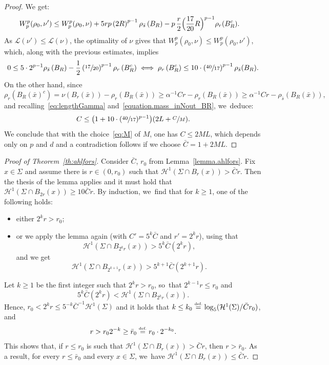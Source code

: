\documentclass[JEP,XML,SOM,Unicode,NoFloatCountersInSection,published]{cedram}
\theoremstyle{definition}
\newcommand{\eqdef}{\ensuremath{\stackrel{\mbox{\upshape\tiny def.}}{=}}}
\newcommand\cH{\mathcal{H}}
\begin{document}
\begin{proof}
We get:
\begin{align*}
W_p^p(\rho_0, \nu')
&\le
W_p^p(\rho_0, \nu)
+
5rp
\left(2R\right)^{p-1}\rho_{\bar s}\left(B_R\right)
-
p\,\frac{r}{2}
\Bigl(\frac{17}{20}R\Bigr)^{p-1}\rho_r(B_R^c).
\end{align*}
As $\mathcal{L}(\nu') \le \mathcal{L}(\nu)$, the optimality of $\nu$ gives that $W_p^p(\rho_0, \nu) \le W_p^p(\rho_0, \nu')$, which, along with the previous estimates, implies
\[
0 \le
5\cdot
2^{p-1}\rho_{\bar s}\left(B_R\right)
-
\frac{1}{2}
\left(\sfrac{17}{20}\right)^{p-1}\rho_r\left(B_R^c\right)
\iff
\rho_r\left(B_R^c\right)\le 10\cdot \left(\sfrac{40}{17}\right)^{p-1}
\rho_{\bar s}(B_R).
\]
On the other hand, since
\begin{equation*}
\rho_{r}\left(B_R(\bar x)^c\right) = \nu(B_r(\bar x))- \rho_r(B_R(\bar x)) \ge \alpha^{-1}Cr - \rho_r(B_R(\bar x))
\ge \alpha^{-1}Cr - \rho_{\bar s}(B_R(\bar x)),
\end{equation*}
and recalling~\eqref{eq:lengthGamma} and~\eqref{equation.mass_inNout_BR}, we~deduce:
\[
C
\le \bigl( 1+10\cdot(\sfrac{40}{17})^{p-1} \bigr)(2L+\sfrac{C}{M}).
\]
We conclude that with the choice~\eqref{eq:M} of $M$,
one has $C\le 2M L$, which depends only on $p$ and $d$ and a contradiction follows
if we choose $\bar C=1+2M L$.
\end{proof}

\begin{proof}[Proof of Theorem~\ref{th:ahlfors}]
Consider $\bar C$, $r_0$ from Lemma~\ref{lemma.ahlfors}. Fix $x\in \Sigma$ and assume
there is $r\in (0,r_0)$ such that $\cH^1(\Sigma\cap B_r(x)) > \bar Cr$. Then the thesis of the lemma applies and it must hold that $\cH^1(\Sigma\cap B_{2r}(x)) \ge 10\bar Cr$. By induction, we~find that for $k\ge 1$, one of the following holds:
\begin{itemize}
\item either $2^k r > r_0$;
\item or we apply the lemma again (with $C'=5^k\bar C$ and $r'=2^kr$), using that
\[
\cH^1(\Sigma\cap B_{2^{k}r}(x)) > 5^{k}\bar C(2^k r),
\]
and we get
\[
\cH^1(\Sigma\cap B_{2^{k+1}r}(x)) > 5^{k+1}\bar C(2^{k+1}r).
\]
\end{itemize}

Let $k\ge 1$ be the first integer such that $2^k r> r_0$, so~that $2^{k-1}r\le r_0$
and
\[
5^{k}\bar C(2^{k}r) < \cH^1(\Sigma\cap B_{2^{k}r}(x)).
\]
Hence, $r_0 < 2^kr \le 5^{-k}\bar C^{-1}\cH^1(\Sigma)$ and it holds that $k\le k_0\eqdef \log_5 (\cH^1(\Sigma)/\bar C r_0)$,
and
\[
r > r_0 2^{-k} \ge \bar r_0 \eqdef r_0 \cdot 2^{-k_0}.
\]
This shows that, if $r \le r_0$ is such that $\cH^1(\Sigma\cap B_r(x)) > \bar Cr$, then $r>\bar r_0$. As a result, for every $r\le \bar r_0$ and every $x\in\Sigma$, we~have $\cH^1(\Sigma\cap B_r(x))\le \bar Cr$.
\end{proof}
\end{document}

